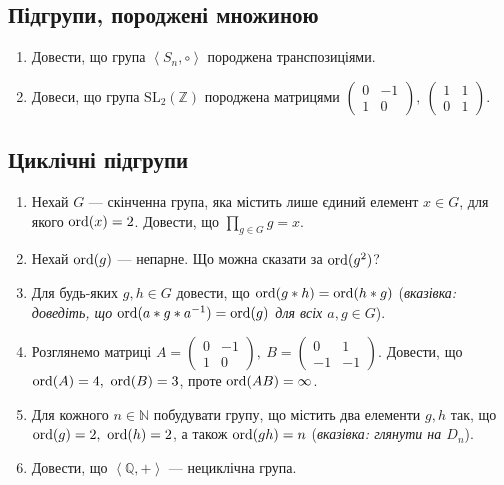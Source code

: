 \documentclass{math_library}
\begin{document}
\subsection{Підгрупи, породжені множиною}
\begin{enumerate}[wide=0pt,label=\thesubsection.\arabic*]
\item Довести, що група $\left< S_n, \circ \right>$ породжена транспозиціями.

\item Довеси, що група $\mathrm{SL}_2(\mathbb{Z})$ породжена матрицями $\begin{pmatrix}
0 & -1 \\
1 & 0
\end{pmatrix},\ \begin{pmatrix}
1 & 1 \\
0 & 1
\end{pmatrix}$.
\end{enumerate}

\subsection{Циклічні підгрупи}
\begin{enumerate}[wide=0pt,label=\thesubsection.\arabic*]
\item Нехай $G$ --- скінченна група, яка містить лише єдиний елемент $x \in G$, для якого $\operatorname{ord} (x) = 2$. Довести, що $\displaystyle\prod_{g \in G} g = x$.

\item Нехай $\operatorname{ord}(g)$ --- непарне. Що можна сказати за $\operatorname{ord}(g^2)$? \phantom{(теж непарне)}

\item Для будь-яких $g,h \in G$ довести, що $\operatorname{ord}(g*h) = \operatorname{ord}(h*g)$ (\textit{вказівка: доведіть, що $\operatorname{ord}(a*g*a^{-1}) = \operatorname{ord}(g)$ для всіх $a,g \in G$}).

\item Розглянемо матриці $A = \begin{pmatrix}
0 & -1 \\
1 & 0
\end{pmatrix},\ B = \begin{pmatrix}
0 & 1 \\
-1 & -1
\end{pmatrix}$. Довести, що $\operatorname{ord}(A) = 4,\ \operatorname{ord}(B) = 3$, проте $\operatorname{ord}(AB) = \infty$.

\item Для кожного $n \in \mathbb{N}$ побудувати групу, що містить два елементи $g,h$ так, що $\operatorname{ord}(g) = 2,\ \operatorname{ord}(h) = 2$, а також $\operatorname{ord}(gh) = n$ (\textit{вказівка: глянути на $D_n$}).

\item Довести, що $\left< \mathbb{Q},+\right>$ --- нециклічна група.
\end{enumerate}
\end{document}

